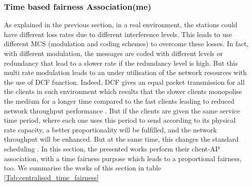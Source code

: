 \documentclass[journal,transmag]{IEEEtran}
\begin{document}
\subsubsection{Time based fairness Association(me)}
As explained in the previous section, in a real environment, the stations could have different loss rates due to different interference levels. This leads to use different MCS (modulation and coding schemes) to overcome these losses. In fact, with different modulation, the messages are coded with different levels or redundancy that lead to a slower rate if the redundancy level is high. But this multi rate modulation leads to an under utilisation of the network resources with the use of DCF function. Indeed, DCF gives an equal packet transmission for all the clients in such environment which results that the slower clients monopolise the medium for a longer time compared to the fast clients leading to reduced network throughput performance \cite{08proportional_fairness_multiRate_LAN,16rigourous_practical_proportional_fair_AP}. But if the clients are given the same service time period, where each one uses this period to send according to its physical rate capacity, a better proportionality will be fulfilled, and the network throughput will be enhanced. But at the same time, this changes the standard scheduling \cite{16AP_association_optimisation_fairness}. In this section, the presented works perform their client-AP association, with a time fairness purpose which leads to a proportional fairness, too. We summarise the works of this section in table \ref{Tab:centralised_time_fairness} 
\end{document}
